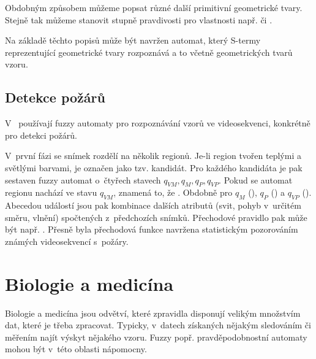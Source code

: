 Obdobným způsobem můžeme popsat různé další primitivní geometrické tvary. Stejně tak můžeme stanovit stupně pravdivosti pro vlastnosti např.  či .

Na základě těchto popisů může být navržen automat, který S-termy reprezentující geometrické tvary rozpoznává a to včetně geometrických tvarů  vzoru.

\subsection{Detekce požárů}
V~\cite{HamKoNam-FirFlaDetBasFuzFinAut, KoHamNam-ModForFuFiAuDetIrrFirFla} používají fuzzy automaty pro rozpoznávání vzorů ve videosekvenci, konkrétně pro detekci požárů.

V~první fázi se snímek rozdělí na několik regionů. Je-li region tvořen teplými a světlými barvami, je označen jako tzv. kandidát. Pro každého kandidáta je pak sestaven fuzzy automat o~čtyřech stavech $q_{VM}, q_{M}, q_{P}, q_{VP}$. Pokud se automat regionu nachází ve stavu $q_{VM}$, znamená to, že . Obdobně pro $q_{M}$ (), $q_{P}$ () a $q_{VP}$ (). Abecedou událostí jsou pak kombinace dalších atributů (svit, pohyb v~určitém směru, vlnění) spočtených z~předchozích snímků. Přechodové pravidlo pak může být např. . Přesně byla přechodová funkce navržena statistickým pozorováním známých videosekvencí s~požáry.

\section{Biologie a medicína}

Biologie a medicína jsou odvětví, které zpravidla disponují velikým množstvím dat, které je třeba zpracovat. Typicky, v~datech získaných nějakým sledováním či měřením najít výskyt nějakého vzoru. Fuzzy popř. pravděpodobnostní automaty mohou být v~této oblasti nápomocny.

